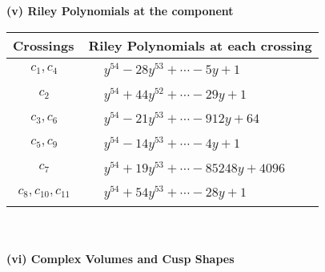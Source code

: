 \documentclass[1p]{elsarticle_modified}
\theoremstyle{definition}
\begin{document}
\newpage\renewcommand{\arraystretch}{1}
\flushleft \textbf{(v) Riley Polynomials at the component}\newline \\
\begin{tabular}{m{50pt}|m{274pt}}
Crossings & \hspace{64pt}Riley Polynomials at each crossing \\
\hline $$\begin{aligned}c_{1},c_{4}\end{aligned}$$&$\begin{aligned}
&y^{54}-28 y^{53}+\cdots-5 y+1
\end{aligned}$\\
\hline $$\begin{aligned}c_{2}\end{aligned}$$&$\begin{aligned}
&y^{54}+44 y^{52}+\cdots-29 y+1
\end{aligned}$\\
\hline $$\begin{aligned}c_{3},c_{6}\end{aligned}$$&$\begin{aligned}
&y^{54}-21 y^{53}+\cdots-912 y+64
\end{aligned}$\\
\hline $$\begin{aligned}c_{5},c_{9}\end{aligned}$$&$\begin{aligned}
&y^{54}-14 y^{53}+\cdots-4 y+1
\end{aligned}$\\
\hline $$\begin{aligned}c_{7}\end{aligned}$$&$\begin{aligned}
&y^{54}+19 y^{53}+\cdots-85248 y+4096
\end{aligned}$\\
\hline $$\begin{aligned}c_{8},c_{10},c_{11}\end{aligned}$$&$\begin{aligned}
&y^{54}+54 y^{53}+\cdots-28 y+1
\end{aligned}$\\
\hline
\end{tabular}\\~\\
\newpage\flushleft \textbf{(vi) Complex Volumes and Cusp Shapes}
\end{document}
